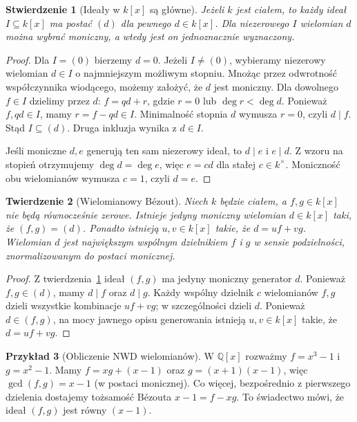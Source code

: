\documentclass[11pt,a4paper,openany]{report}
\numberwithin{equation}{section}
\theoremstyle{plain}
\newtheorem{twierdzenie}{Twierdzenie}[section]
\newtheorem{stwierdzenie}[twierdzenie]{Stwierdzenie}
\theoremstyle{definition}
\newtheorem{przyklad}[twierdzenie]{Przykład}
\theoremstyle{remark}
\newcommand{\Q}{\mathbb Q}
\begin{document}
\begin{stwierdzenie}[Ideały w {$k[x]$} są główne]
\label{st:kx-glowne}
Jeżeli $k$ jest ciałem, to każdy ideał $I\subseteq k[x]$
ma postać $(d)$ dla pewnego $d\in k[x]$.
Dla niezerowego $I$ wielomian $d$ można wybrać moniczny,
a wtedy jest on jednoznacznie wyznaczony.
\end{stwierdzenie}
\begin{proof}
Dla $I=(0)$ bierzemy $d=0$.
Jeżeli $I\ne(0)$, wybieramy niezerowy wielomian $d\in I$
o najmniejszym możliwym stopniu. Mnożąc przez odwrotność
współczynnika wiodącego, możemy założyć, że $d$ jest moniczny.
Dla dowolnego $f\in I$ dzielimy przez $d$:
$f=qd+r$, gdzie $r=0$ lub $\deg r<\deg d$.
Ponieważ $f,qd\in I$, mamy $r=f-qd\in I$.
Minimalność stopnia $d$ wymusza $r=0$, czyli $d\mid f$.
Stąd $I\subseteq(d)$. Druga inkluzja wynika z $d\in I$.

Jeśli moniczne $d,e$ generują ten sam niezerowy ideał,
to $d\mid e$ i $e\mid d$. Z wzoru na stopień otrzymujemy
$\deg d=\deg e$, więc $e=cd$ dla stałej $c\in k^\times$.
Moniczność obu wielomianów wymusza $c=1$, czyli $d=e$.
\end{proof}

\begin{twierdzenie}[Wielomianowy Bézout]
\label{tw:bezout-pol}
Niech $k$ będzie ciałem, a $f,g\in k[x]$ nie będą równocześnie zerowe.
Istnieje jedyny moniczny wielomian $d\in k[x]$ taki, że
$(f,g)=(d)$. Ponadto istnieją $u,v\in k[x]$ takie, że
$d=uf+vg$. Wielomian $d$ jest największym wspólnym dzielnikiem
$f$ i $g$ w sensie podzielności, znormalizowanym do postaci monicznej.
\end{twierdzenie}
\begin{proof}
Z twierdzenia~\ref{st:kx-glowne} ideał $(f,g)$ ma jedyny moniczny
generator $d$. Ponieważ $f,g\in(d)$, mamy $d\mid f$ oraz $d\mid g$.
Każdy wspólny dzielnik $c$ wielomianów $f,g$ dzieli wszystkie
kombinacje $uf+vg$; w szczególności dzieli $d$.
Ponieważ $d\in(f,g)$, na mocy jawnego opisu generowania
istnieją $u,v\in k[x]$ takie, że $d=uf+vg$.
\end{proof}

\begin{przyklad}[Obliczenie NWD wielomianów]
W $\Q[x]$ rozważmy $f=x^3-1$ i $g=x^2-1$.
Mamy $f=xg+(x-1)$ oraz $g=(x+1)(x-1)$,
więc $\gcd(f,g)=x-1$ (w postaci monicznej).
Co więcej, bezpośrednio z pierwszego dzielenia dostajemy
tożsamość Bézouta $x-1=f-xg$.
To świadectwo mówi, że ideał $(f,g)$ jest równy $(x-1)$.
\end{przyklad}
\end{document}

